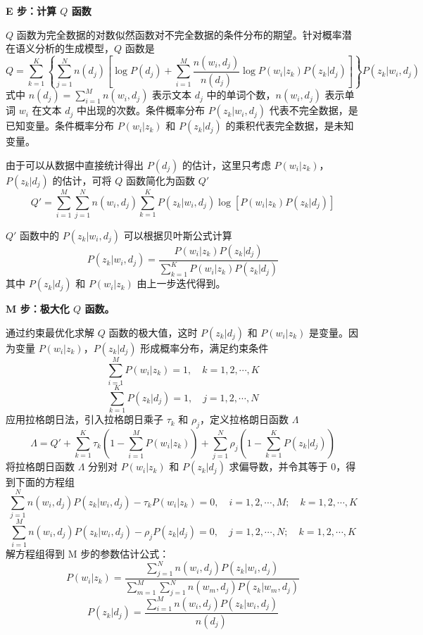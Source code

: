 \documentclass[UTF8,12pt,a4paper,fontset=fandol]{ctexart}
\begin{document}
\noindent\textbf{E 步：计算 $Q$ 函数}

$Q$ 函数为完全数据的对数似然函数对不完全数据的条件分布的期望。针对概率潜在语义分析的生成模型，$Q$ 函数是
\begin{equation}
Q=\sum_{k=1}^{K}\left\{\sum_{j=1}^{N}n(d_j)\left[\log P(d_j)+\sum_{i=1}^{M}\frac{n(w_i,d_j)}{n(d_j)}\log P(w_i|z_k)P(z_k|d_j)\right]\right\}P(z_k|w_i,d_j)
\tag{18.9}
\end{equation}
式中 $n(d_j)=\sum_{i=1}^{M}n(w_i,d_j)$ 表示文本 $d_j$ 中的单词个数，$n(w_i,d_j)$ 表示单词 $w_i$ 在文本 $d_j$ 中出现的次数。条件概率分布 $P(z_k|w_i,d_j)$ 代表不完全数据，是已知变量。条件概率分布 $P(w_i|z_k)$ 和 $P(z_k|d_j)$ 的乘积代表完全数据，是未知变量。

由于可以从数据中直接统计得出 $P(d_j)$ 的估计，这里只考虑 $P(w_i|z_k)$，$P(z_k|d_j)$ 的估计，可将 $Q$ 函数简化为函数 $Q'$
\begin{equation}
Q'=\sum_{i=1}^{M}\sum_{j=1}^{N}n(w_i,d_j)\sum_{k=1}^{K}P(z_k|w_i,d_j)\log[P(w_i|z_k)P(z_k|d_j)]
\tag{18.10}
\end{equation}

$Q'$ 函数中的 $P(z_k|w_i,d_j)$ 可以根据贝叶斯公式计算
\begin{equation}
P(z_k|w_i,d_j)=
\frac{P(w_i|z_k)P(z_k|d_j)}
{\displaystyle\sum_{k=1}^{K}P(w_i|z_k)P(z_k|d_j)}
\tag{18.11}
\end{equation}
其中 $P(z_k|d_j)$ 和 $P(w_i|z_k)$ 由上一步迭代得到。

\noindent\textbf{M 步：极大化 $Q$ 函数。}

通过约束最优化求解 $Q$ 函数的极大值，这时 $P(z_k|d_j)$ 和 $P(w_i|z_k)$ 是变量。因为变量 $P(w_i|z_k)$，$P(z_k|d_j)$ 形成概率分布，满足约束条件
\[
\sum_{i=1}^{M}P(w_i|z_k)=1,\quad k=1,2,\cdots,K
\]
\[
\sum_{k=1}^{K}P(z_k|d_j)=1,\quad j=1,2,\cdots,N
\]
应用拉格朗日法，引入拉格朗日乘子 $\tau_k$ 和 $\rho_j$，定义拉格朗日函数 $\Lambda$
\[
\Lambda=Q'+\sum_{k=1}^{K}\tau_k\left(1-\sum_{i=1}^{M}P(w_i|z_k)\right)+\sum_{j=1}^{N}\rho_j\left(1-\sum_{k=1}^{K}P(z_k|d_j)\right)
\]
将拉格朗日函数 $\Lambda$ 分别对 $P(w_i|z_k)$ 和 $P(z_k|d_j)$ 求偏导数，并令其等于 0，得到下面的方程组
\[
\sum_{j=1}^{N}n(w_i,d_j)P(z_k|w_i,d_j)-\tau_k P(w_i|z_k)=0,\quad i=1,2,\cdots,M;\quad k=1,2,\cdots,K
\]
\[
\sum_{i=1}^{M}n(w_i,d_j)P(z_k|w_i,d_j)-\rho_j P(z_k|d_j)=0,\quad j=1,2,\cdots,N;\quad k=1,2,\cdots,K
\]
解方程组得到 M 步的参数估计公式：
\begin{equation}
P(w_i|z_k)=
\frac{\displaystyle\sum_{j=1}^{N}n(w_i,d_j)P(z_k|w_i,d_j)}
{\displaystyle\sum_{m=1}^{M}\sum_{j=1}^{N}n(w_m,d_j)P(z_k|w_m,d_j)}
\tag{18.12}
\end{equation}
\begin{equation}
P(z_k|d_j)=
\frac{\displaystyle\sum_{i=1}^{M}n(w_i,d_j)P(z_k|w_i,d_j)}
{n(d_j)}
\tag{18.13}
\end{equation}
\end{document}
